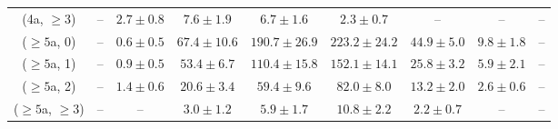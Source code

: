 \begin{table}[h!]
{\begin{tabular}{ccccccccc}
	(4a, $\ge3$) & -- & $2.7\pm 0.8$ & $7.6\pm 1.9$ & $6.7\pm 1.6$ & $2.3\pm 0.7$ & -- & -- & -- \\[0.5ex] 
	($\ge5$a, 0) & -- & $0.6\pm 0.5$ & $67.4\pm 10.6$ & $190.7\pm 26.9$ & $223.2\pm 24.2$ & $44.9\pm 5.0$ & $9.8\pm 1.8$ & -- \\[0.5ex] 
	($\ge5$a, 1) & -- & $0.9\pm 0.5$ & $53.4\pm 6.7$ & $110.4\pm 15.8$ & $152.1\pm 14.1$ & $25.8\pm 3.2$ & $5.9\pm 2.1$ & -- \\[0.5ex] 
	($\ge5$a, 2) & -- & $1.4\pm 0.6$ & $20.6\pm 3.4$ & $59.4\pm 9.6$ & $82.0\pm 8.0$ & $13.2\pm 2.0$ & $2.6\pm 0.6$ & -- \\[0.5ex] 
	($\ge5$a, $\ge3$) & -- & -- & $3.0\pm 1.2$ & $5.9\pm 1.7$ & $10.8\pm 2.2$ & $2.2\pm 0.7$ & -- & -- \\[0.5ex] 
	\hline
	\hline
\end{tabular}}
\end{table}
